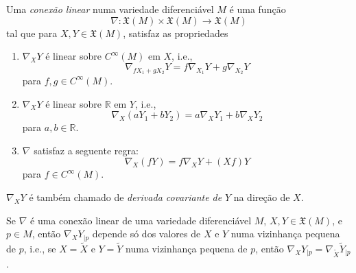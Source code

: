 \begin{definicao}
	Uma \emph{conexão linear} numa variedade diferenciável $M$ é uma função
	\begin{equation*}
		\nabla: \mathfrak{X}(M) \times \mathfrak{X}(M) \rightarrow \mathfrak{X}(M)
	\end{equation*}
	tal que para $X,Y \in \mathfrak{X}(M)$, satisfaz as propriedades
	\begin{enumerate}
		\item $\nabla_X Y$ é linear sobre $C^\infty (M)$ em $X$, i.e.,
		\begin{equation*}
			\nabla_{f X_1 + g X_2} Y = f \nabla_{X_1} Y + g \nabla_{X_2} Y
		\end{equation*}
		para $f,g \in C^{\infty} (M)$.
		
		\item $\nabla_X Y$ é linear sobre $\mathbb{R}$ em $Y$, i.e.,
		\begin{equation*}
			\nabla_X (a Y_1 + b Y_2) = a \nabla_X Y_1 + b \nabla_X Y_2
		\end{equation*}
		para $a,b \in \mathbb{R}$.
		
		\item $\nabla$ satisfaz a seguente regra:
		\begin{equation*}
			\nabla_X (f Y) = f \nabla_X Y + (X f) Y
		\end{equation*}
		para $f \in C^{\infty}(M)$.
	\end{enumerate}
\end{definicao}

\begin{observacao}
	$\nabla_X Y$ é também chamado de \emph{derivada covariante de} $Y$ na direção de $X$.
\end{observacao}

\begin{proposicao}\label{boa_definicao_conexao_1}
	Se $\nabla$ é uma conexão linear de uma variedade diferenciável $M$, $X,Y \in \mathfrak{X}(M)$, e $p \in M$, então $\nabla_X Y_{|p}$ depende só dos valores de $X$ e $Y$ numa vizinhança pequena de $p$, i.e., se $X = \tilde{X}$ e $Y = \tilde{Y}$ numa vizinhança pequena de $p$, então $\nabla_X Y_{|p} = \nabla_{\tilde{X}} \tilde{Y}_{|p}$.
\end{proposicao}

